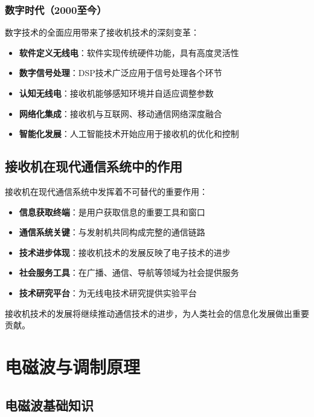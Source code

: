 \documentclass[12pt,UTF8]{ctexbook}
\begin{document}
\subsection{数字时代（2000至今）}

数字技术的全面应用带来了接收机技术的深刻变革：

\begin{itemize}[leftmargin=3.5em]
    \item \textbf{软件定义无线电}：软件实现传统硬件功能，具有高度灵活性
    \item \textbf{数字信号处理}：DSP技术广泛应用于信号处理各个环节
    \item \textbf{认知无线电}：接收机能够感知环境并自适应调整参数
    \item \textbf{网络化集成}：接收机与互联网、移动通信网络深度融合
    \item \textbf{智能化发展}：人工智能技术开始应用于接收机的优化和控制
\end{itemize}

\section{接收机在现代通信系统中的作用}

接收机在现代通信系统中发挥着不可替代的重要作用：

\begin{itemize}[leftmargin=3.5em]
    \item \textbf{信息获取终端}：是用户获取信息的重要工具和窗口
    \item \textbf{通信系统关键}：与发射机共同构成完整的通信链路
    \item \textbf{技术进步体现}：接收机技术的发展反映了电子技术的进步
    \item \textbf{社会服务工具}：在广播、通信、导航等领域为社会提供服务
    \item \textbf{技术研究平台}：为无线电技术研究提供实验平台
\end{itemize}

接收机技术的发展将继续推动通信技术的进步，为人类社会的信息化发展做出重要贡献。

\chapter{电磁波与调制原理}

\section{电磁波基础知识}
\end{document}

